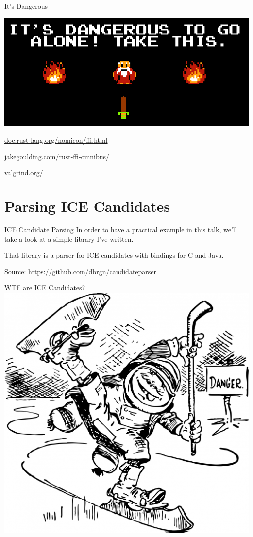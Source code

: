 \documentclass[aspectratio=1610,14pt,t]{beamer}
\begin{document}
\begin{frame}[c]{It's Dangerous}
  \begin{center}
  \includegraphics[width=.7\textwidth]{img/dangerous.png}

  \url{doc.rust-lang.org/nomicon/ffi.html}

  \url{jakegoulding.com/rust-ffi-omnibus/}

  \url{valgrind.org/}
  \end{center}
\end{frame}


\section{Parsing ICE Candidates}

\begin{frame}[c]{ICE Candidate Parsing}
  In order to have a practical example in this talk, we'll take a look at a
  simple library I've written.

  That library is a parser for ICE candidates with bindings for C and Java.

  Source: {\small \url{https://github.com/dbrgn/candidateparser}}
\end{frame}

\begin{frame}[c]{WTF are ICE Candidates?}
  \center
  \includegraphics[width=.5\textwidth]{img/ice-skater.jpg}
\end{frame}
\end{document}
